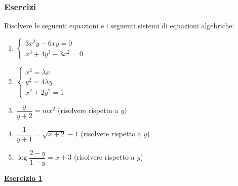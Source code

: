 \documentclass[a4paper]{article}
\newcommand{\example}[1]{\textcolor{Green4}{\textbf{#1}}}
\begin{document}
	\subsubsection{Esercizi}\label{subsubsection: esercizi (algebra)}

	Risolvere le seguenti equazioni e i seguenti sistemi di equazioni algebriche:
	\begin{enumerate}
		\item $\begin{cases}
			3x^{2}y - 6xy = 0 \\
			x^{3} + 4y^{3} - 3x^{2} = 0
		\end{cases}$

		\item $\begin{cases}
			x^{2} = \lambda x \\
			y^{2} = 4\lambda y \\
			x^{2} + 2y^{2} = 1
		\end{cases}$

		\item $\dfrac{y}{y+2} = mx^{2}$ (risolvere rispetto a $y$)
		
		\item $\dfrac{1}{y+1} = \sqrt{x+2}-1$ (risolvere rispetto a $y$)
		
		\item $\log{\dfrac{2-y}{1-y}} = x+3$ (risolvere rispetto a $y$)
	\end{enumerate}

	\begin{flushleft}
		\example{\underline{Esercizio 1}}
	\end{flushleft}
	
\end{document}
